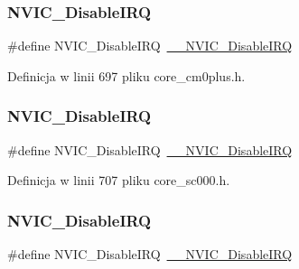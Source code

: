 \subsubsection{\texorpdfstring{N\+V\+I\+C\+\_\+\+Disable\+I\+RQ}{NVIC\_DisableIRQ}\hspace{0.1cm}{\footnotesize\ttfamily [3/12]}}
{\footnotesize\ttfamily \#define N\+V\+I\+C\+\_\+\+Disable\+I\+RQ~\hyperlink{group___c_m_s_i_s___core___n_v_i_c_functions_gae016e4c1986312044ee768806537d52f}{\+\_\+\+\_\+\+N\+V\+I\+C\+\_\+\+Disable\+I\+RQ}}



Definicja w linii 697 pliku core\+\_\+cm0plus.\+h.

\mbox{\label{group___c_m_s_i_s___core___n_v_i_c_functions_ga73b4e251f59cab4e9a5e234aac02ae57}} 
\subsubsection{\texorpdfstring{N\+V\+I\+C\+\_\+\+Disable\+I\+RQ}{NVIC\_DisableIRQ}\hspace{0.1cm}{\footnotesize\ttfamily [4/12]}}
{\footnotesize\ttfamily \#define N\+V\+I\+C\+\_\+\+Disable\+I\+RQ~\hyperlink{group___c_m_s_i_s___core___n_v_i_c_functions_gae016e4c1986312044ee768806537d52f}{\+\_\+\+\_\+\+N\+V\+I\+C\+\_\+\+Disable\+I\+RQ}}



Definicja w linii 707 pliku core\+\_\+sc000.\+h.

\mbox{\label{group___c_m_s_i_s___core___n_v_i_c_functions_ga73b4e251f59cab4e9a5e234aac02ae57}} 
\subsubsection{\texorpdfstring{N\+V\+I\+C\+\_\+\+Disable\+I\+RQ}{NVIC\_DisableIRQ}\hspace{0.1cm}{\footnotesize\ttfamily [5/12]}}
{\footnotesize\ttfamily \#define N\+V\+I\+C\+\_\+\+Disable\+I\+RQ~\hyperlink{group___c_m_s_i_s___core___n_v_i_c_functions_gae016e4c1986312044ee768806537d52f}{\+\_\+\+\_\+\+N\+V\+I\+C\+\_\+\+Disable\+I\+RQ}}



